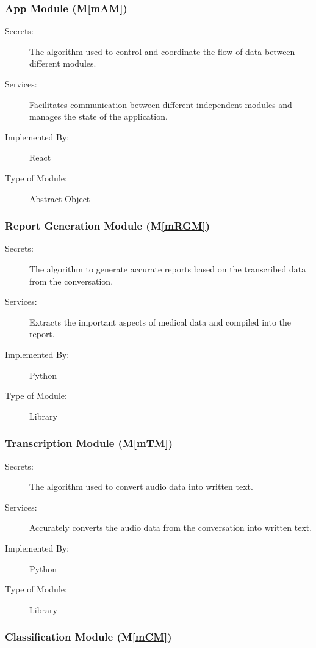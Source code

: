 \documentclass[12pt, titlepage]{article}
\newcommand{\mref}[1]{M\ref{#1}}
\begin{document}
\subsubsection{App Module (\mref{mAM})}

\begin{description}
\item[Secrets:] The algorithm used to control and coordinate the flow of data between different modules.
\item[Services:] Facilitates communication between different independent modules and manages the state of the application.
\item[Implemented By:] React
\item[Type of Module:] Abstract Object
\end{description}

\subsubsection{Report Generation Module (\mref{mRGM})}

\begin{description}
\item[Secrets:] The algorithm to generate accurate reports based on the transcribed data from the conversation.
\item[Services:] Extracts the important aspects of medical data and compiled into the report.
\item[Implemented By:] Python
\item[Type of Module:] Library
\end{description}

\subsubsection{Transcription Module (\mref{mTM})}

\begin{description}
\item[Secrets:] The algorithm used to convert audio data into written text.
\item[Services:] Accurately converts the audio data from the conversation into written text.   
\item[Implemented By:] Python
\item[Type of Module:] Library
\end{description}

\subsubsection{Classification Module (\mref{mCM})}
\end{document}
